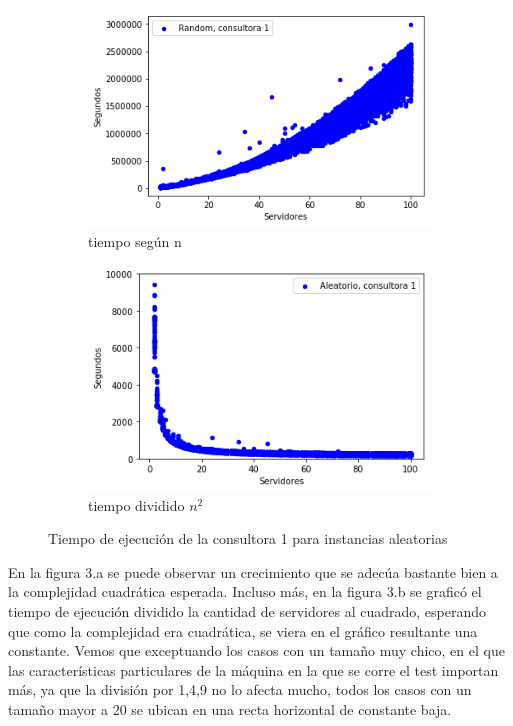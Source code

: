 \documentclass[A4paper,oneside,fleqn,11pt]{article}
\theoremstyle{definition}
\begin{document}
\begin{figure}[H] %
    \begin{subfigure}[b]{0.45\textwidth}
        \includegraphics[width=\textwidth]{graficosEj2/r1}
        \caption[center]{tiempo según n}
        \label{ni se pa que sirve esto}
    \end{subfigure}
    \begin{subfigure}[b]{0.45\textwidth}
        \includegraphics[width=\textwidth]{graficosEj2/complejidad1}
        \caption{tiempo dividido $n^2$}
        \label{ni se pa que sirve esto}
    \end{subfigure}
    \caption{Tiempo de ejecución de la consultora 1 para instancias aleatorias}
\end{figure}

En la figura 3.a se puede observar un crecimiento que se adecúa bastante bien a la complejidad cuadrática esperada. Incluso más, en la figura 3.b se graficó el tiempo de ejecución dividido la cantidad de servidores al cuadrado, esperando que como la complejidad era cuadrática, se viera en el gráfico resultante una constante. Vemos que exceptuando los casos con un tamaño muy chico, en el que las características particulares de la máquina en la que se corre el test importan más, ya que la división por 1,4,9 no lo afecta mucho, todos los casos con un tamaño mayor a 20 se ubican en una recta horizontal de constante baja.
\end{document}
